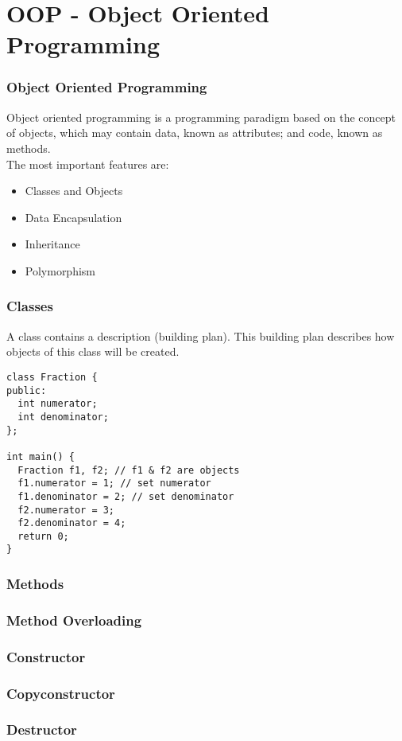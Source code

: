 \section{OOP - Object Oriented Programming}

\begin{frame}[fragile]
\frametitle{Object Oriented Programming}
Object oriented programming is a programming paradigm based on the concept of objects,
which may contain data, known as attributes; and code, known as methods.\\
The most important features are:
\begin{itemize}
\item Classes and Objects
\item Data Encapsulation
\item Inheritance
\item Polymorphism
\end{itemize}
\end{frame}

\begin{frame}[fragile]
\frametitle{Classes}
A class contains a description (building plan). This building plan describes how
objects of this class will be created.
{\tiny
\begin{lstlisting}
class Fraction {
public:
  int numerator;
  int denominator;
};
	
int main() {
  Fraction f1, f2; // f1 & f2 are objects
  f1.numerator = 1; // set numerator
  f1.denominator = 2; // set denominator
  f2.numerator = 3;
  f2.denominator = 4;
  return 0;
}
\end{lstlisting}
}
\end{frame}

\begin{frame}[fragile]
\frametitle{Methods}
\end{frame}

\begin{frame}[fragile]
\frametitle{Method Overloading}
\end{frame}

\begin{frame}[fragile]
\frametitle{Constructor}
\end{frame}

\begin{frame}[fragile]
\frametitle{Copyconstructor}
\end{frame}

\begin{frame}[fragile]
\frametitle{Destructor}
\end{frame}

